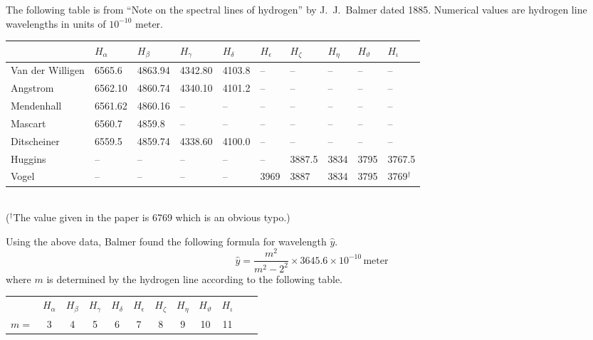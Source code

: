 \documentclass[12pt]{article}
\begin{document}
\noindent
The following table is from
``Note on the spectral lines of hydrogen''
by J.~J.~Balmer dated 1885.
Numerical values are hydrogen line wavelengths in units of $10^{-10}$ meter.
\begin{center}
\footnotesize
\begin{tabular}{|l|l|l|l|l|l|l|l|l|l|}
\hline
 & $H_\alpha$ & $H_\beta$ & $H_\gamma$ & $H_\delta$ & $H_\epsilon$ &
$H_\zeta$ & $H_\eta$ & $H_\vartheta$ & $H_\iota$
\\
\hline
Van der Willigen & 6565.6 & 4863.94 & 4342.80 & 4103.8 & -- & -- & -- & -- & --
\\
Angstrom & 6562.10 & 4860.74 & 4340.10 & 4101.2 & -- & -- & -- & -- & --
\\
Mendenhall & 6561.62 & 4860.16 & -- & -- & -- & -- & -- & -- & --
\\
Mascart & 6560.7 & 4859.8 & -- & -- & -- & -- & -- & -- & --
\\
Ditscheiner & 6559.5 & 4859.74 & 4338.60 & 4100.0 & -- & -- & -- & -- & --
\\
Huggins & -- & -- & -- & -- & -- & 3887.5 & 3834 & 3795 & 3767.5
\\
Vogel & -- & -- & -- & -- & 3969 & 3887 & 3834 & 3795 & 3769${}^\dag$
\\
\hline
\end{tabular}
\\
{\footnotesize(${}^\dag$The value given in the paper is 6769 which is an obvious typo.)}
\end{center}

\noindent
Using the above data, Balmer found the following formula
for wavelength $\hat y$.
\begin{equation*}
\hat{y}=\frac{m^2}{m^2-2^2}\times3645.6\times10^{-10}\,\text{meter}
\end{equation*}
where $m$ is determined by the hydrogen line
according to the following table.
\begin{center}
\begin{tabular}{cccccccccccc}
& $H_\alpha$ & $H_\beta$ & $H_\gamma$ & $H_\delta$ & $H_\epsilon$ &
$H_\zeta$ & $H_\eta$ & $H_\vartheta$ & $H_\iota$
\\
$m=$ & 3 & 4 & 5 & 6 & 7 & 8 & 9 & 10 & 11
\end{tabular}
\end{center}
\end{document}
